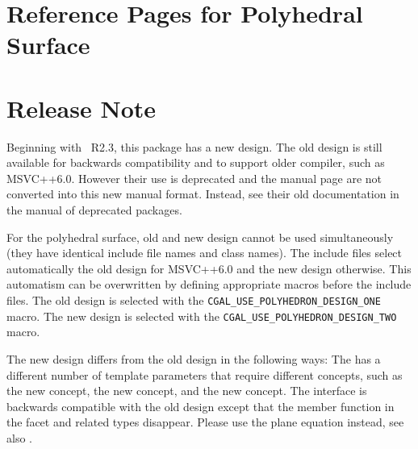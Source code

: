 
\clearpage
\section{Reference Pages for Polyhedral Surface}
\label{chapterPolyhedronRef}


\section*{Release Note}

Beginning with \cgal\ R2.3, this package has a new design.  The old
design is still available for backwards compatibility and to support
older compiler, such as MSVC++6.0. However their use is deprecated and
the manual page are not converted into this new manual
format. Instead, see their old documentation in the manual of 
deprecated packages.

For the polyhedral surface, old and new design cannot be used
simultaneously (they have identical include file names and class
names). The include files select automatically the old design for
MSVC++6.0 and the new design otherwise. This automatism can be
overwritten by defining appropriate macros before the include
files. The old design is selected with the 
\texttt{CGAL\_USE\_POLYHEDRON\_DESIGN\_ONE} macro. The new design 
is selected with the 
\texttt{CGAL\_USE\_POLYHEDRON\_DESIGN\_TWO} macro.

The new design differs from the old design in the following ways: The
 has a different number of template parameters that
require different concepts, such as the new  concept,
the new  concept, and the new
 concept. The  interface is
backwards compatible with the old design except that the
 member function in the facet and related types disappear.
Please use the plane equation instead, see also
.

